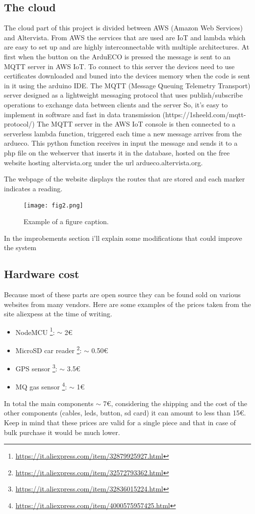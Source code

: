 \documentclass[conference]{IEEEtran}
\begin{document}
	\subsection{The cloud}
	
		The cloud part of this project is divided between AWS (Amazon Web Services) and Altervista.
		From AWS the services that are used are IoT and lambda which are easy to set up and are highly interconnectable with multiple architectures.
		At first when the button on the ArduECO is pressed the message is sent to an MQTT server in AWS IoT.
		To connect to this server the devices need to use certificates downloaded and buned into the devices memory when the code is sent in it using the arduino IDE.
		The MQTT (Message Queuing Telemetry Transport) server designed as a lightweight messaging protocol that uses publish/subscribe operations to exchange data between clients and the server So, it’s easy to implement in software and fast in data transmission (https://1sheeld.com/mqtt-protocol/)
		The MQTT server in the AWS IoT console is then connected to a serverless lambda function, triggered each time a new message arrives from the ardueco.
		This python function receives in input the message and sends it to a php file on the webserver that inserts it in the database, hosted on the free website hosting altervista.org under the url ardueco.altervista.org.
		
		The webpage of the website displays the routes that are stored and each marker indicates a reading.

		\begin{figure}[htbp]
			\centerline{\texttt{[image: fig2.png]}}
			\caption{Example of a figure caption.}
			\label{fig}
		\end{figure}
	
		In the improbements section i'll explain some modifications that could improve the system
	
	\subsection{Hardware cost}
		Because most of these parts are open source they can be found sold on various websites from many vendors.
		Here are some examples of the prices taken from the site aliexpess at the time of writing.
		\begin{itemize}
			\item NodeMCU \footnote{\url{https://it.aliexpress.com/item/32879925927.html}}: $ \sim $ 2\euro
			\item MicroSD car reader \footnote{\url{https://it.aliexpress.com/item/32572793362.html}}: $ \sim $ 0.50\euro
			\item GPS sensor \footnote{\url{https://it.aliexpress.com/item/32836015224.html}}: $ \sim $ 3.5\euro
			\item MQ gas sensor \footnote{\url{https://it.aliexpress.com/item/4000575957425.html}}: $ \sim $ 1\euro
		\end{itemize}
		In total the main components $\sim$ 7\euro, considering the shipping and the cost of the other components (cables, leds, button, sd card) it can amount to less than 15\euro.
		Keep in mind that these prices are valid for a single piece and that in case of bulk purchase it would be much lower.
	
\end{document}
